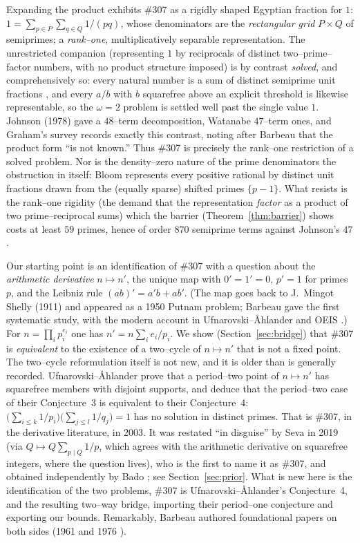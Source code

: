 \documentclass[11pt]{article}
\theoremstyle{definition}
\begin{document}
Expanding the product exhibits \#307 as a rigidly shaped Egyptian fraction for $1$:
$1=\sum_{p\in P}\sum_{q\in Q}1/(pq)$, whose denominators are the \emph{rectangular grid} $P\times Q$
of semiprimes; a \emph{rank--one}, multiplicatively separable representation. The unrestricted
companion (representing $1$ by reciprocals of distinct two--prime--factor numbers, with no product
structure imposed) is by contrast \emph{solved}, and comprehensively so: every natural number is a
sum of distinct semiprime unit fractions \cite{Semiprime2026}, and every $a/b$ with $b$ squarefree
above an explicit threshold is likewise representable, so the $\omega=2$ problem is settled well
past the single value $1$. Johnson (1978) gave a $48$--term decomposition,
Watanabe \cite{Watanabe2020} $47$--term ones, and Graham's survey \cite{GrahamEgyptian} records exactly
this contrast, noting after Barbeau that the product form ``is not known.'' Thus \#307 is precisely the
rank--one restriction of a solved problem. Nor is the density--zero nature of the prime denominators the
obstruction in itself: Bloom \cite{BloomShifted} represents every positive rational by distinct unit
fractions drawn from the (equally sparse) shifted primes $\{p-1\}$. What resists is the rank--one
rigidity (the demand that the representation \emph{factor} as a product of two prime--reciprocal
sums) which the barrier (Theorem~\ref{thm:barrier}) shows costs at least $59$ primes, hence of order
$870$ semiprime terms against Johnson's $47$.

Our starting point is an identification of \#307 with a question about the \emph{arithmetic
derivative} $n\mapsto n'$, the unique map with $0'=1'=0$, $p'=1$ for primes $p$, and the Leibniz
rule $(ab)'=a'b+ab'$. (The map goes back to J.~Mingot Shelly (1911) and appeared as a 1950 Putnam
problem; Barbeau \cite{Barbeau1961} gave the first systematic study, with the modern account in
Ufnarovski--\AA hlander \cite{UfnarovskiAhlander2003} and OEIS \cite{OEIS_A003415}.) For
$n=\prod_i p_i^{e_i}$ one has $n'=n\sum_i e_i/p_i$. We show (Section~\ref{sec:bridge}) that \#307
is \emph{equivalent} to the existence of a two--cycle of $n\mapsto n'$ that is not a fixed point.
The two--cycle reformulation itself is not new, and it is older than is generally recorded.
Ufnarovski--\AA hlander \cite{UfnarovskiAhlander2003} prove that a period--two point of $n\mapsto n'$
has squarefree members with disjoint supports, and deduce that the period--two case of their
Conjecture~3 is equivalent to their Conjecture~4: $\bigl(\sum_{i\le k}1/p_i\bigr)
\bigl(\sum_{j\le l}1/q_j\bigr)=1$ has no solution in distinct primes. That is \#307, in the
derivative literature, in 2003. It was restated ``in disguise'' by Seva \cite{Seva323194} in 2019
(via $Q\mapsto Q\sum_{p\mid Q}1/p$, which agrees with the arithmetic derivative on squarefree
integers, where the question lives), who is the first to name it as \#307, and obtained
independently by Bado \cite{Bado2026}; see Section~\ref{sec:prior}. What is new here is the
identification of the two problems, \#307 is Ufnarovski--\AA hlander's Conjecture~4, and the
resulting two--way bridge, importing their period--one conjecture and exporting our bounds.
Remarkably, Barbeau authored foundational papers on both sides (1961 and 1976
\cite{Barbeau1961,Barbeau1976}).
\end{document}
